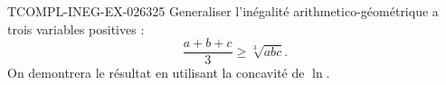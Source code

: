 \begin{exercice}{TCOMPL-INEG-EX-026}{3}{25}
Generaliser l'inégalité arithmetico-géométrique a trois variables positives :
\[ \frac{a+b+c}{3} \geq \sqrt[3]{abc}. \]
On demontrera le résultat en utilisant la concavité de $\ln$.

\end{exercice}

